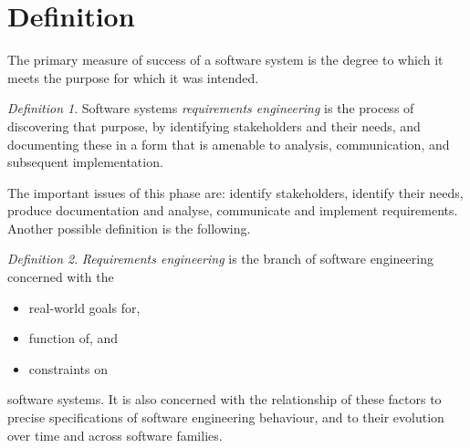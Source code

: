 \documentclass[12pt, a4paper]{report}
\theoremstyle{remark}
\newtheorem*{remark}{Definition}
\begin{document}
\section{Definition}
    The primary measure of success of a software system is the degree to which it meets the purpose for which it was intended.
    \begin{remark}
        Software systems \emph{requirements engineering} is the process of discovering that purpose, by identifying stakeholders and their needs, and documenting these in a form that is amenable to analysis, communication, and subsequent implementation. 
    \end{remark}
    The important issues of this phase are: identify stakeholders, identify their needs, produce documentation and analyse, communicate and implement requirements. Another possible definition is the following. 
    \begin{remark}
        \emph{Requirements engineering} is the branch of software engineering concerned with the 
        \begin{itemize}
            \item real-world goals for,
            \item function of, and
            \item constraints on
        \end{itemize}
        software systems. It is also concerned with the relationship of these factors to precise specifications of software engineering behaviour, and to their evolution over time and across software families. 
    \end{remark}
\end{document}

